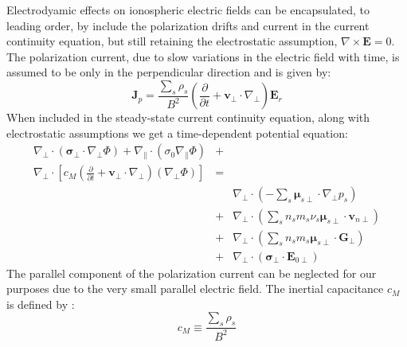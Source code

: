 \documentclass[11pt,letterpaper]{article}
\begin{document}
Electrodyamic effects on ionospheric electric fields can be encapsulated, to leading order, by include the polarization drifts and current in the current continuity equation, but still retaining the electrostatic assumption, $\nabla \times \mathbf{E}=0$.  The polarization current, due to slow variations in the electric field with time, is assumed to be only in the perpendicular direction and is given by:  
\begin{equation}
\mathbf{J}_p = \frac{\sum_s \rho_s}{B^2} \left( \frac{\partial}{\partial t}  + \mathbf{v}_\perp \cdot \nabla_\perp \right) \mathbf{E}_r \label{eqn:polcurr}
\end{equation}
When included in the steady-state current continuity equation, along with electrostatic assumptions we get a time-dependent potential equation:  
\begin{eqnarray}
  \nabla_\perp \cdot \left( \boldsymbol{\sigma}_\perp \cdot \nabla_\perp \Phi \right) + \nabla_\parallel \cdot \left( \sigma_0 \nabla_\parallel \Phi \right) &+& \nonumber \\
 \nabla_\perp \cdot \left[ c_M \left( \frac{\partial}{\partial t}  + \mathbf{v}_\perp \cdot \nabla_\perp \right) \left( \nabla_\perp \Phi \right) \right]  &=& \nonumber \\ 
& & \nabla_\perp \cdot \left(  - \sum_s \boldsymbol{\mu}_{s\perp} \cdot \nabla_\perp p_s \right) \nonumber \\
&+& \nabla_\perp \cdot \left(  \sum_s n_s m_s \nu_s \boldsymbol{\mu}_{s\perp} \cdot \mathbf{v}_{n\perp} \right) \nonumber \\
&+& \nabla_\perp \cdot \left(  \sum_s n_s m_s  \boldsymbol{\mu}_{s\perp} \cdot \mathbf{G}_\perp \right)  \nonumber \\
&+& \nabla_\perp \cdot \left( \boldsymbol{\sigma}_\perp \cdot \mathbf{E}_{0\perp} \right) \label{divJSS2}
\end{eqnarray}
The parallel component of the polarization current can be neglected for our purposes due to the very small parallel electric field.  The inertial capacitance $c_M$ is defined by \citep{Mitchell:1985}:  
\begin{equation}
c_M \equiv \frac{\sum_s \rho_s}{B^2}
\end{equation}
\end{document}
